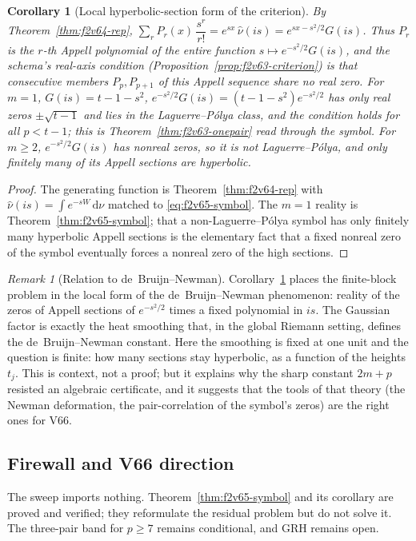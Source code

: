 \documentclass[11pt]{article}
\newtheorem{corollary}[theorem]{Corollary}
\theoremstyle{definition}
\theoremstyle{remark}
\newtheorem{remark}[theorem]{Remark}
\newcommand{\dd}{\,\mathrm d}
\begin{document}
\begin{corollary}[Local hyperbolic-section form of the criterion]
\label{cor:f2v65-section}
By Theorem~\ref{thm:f2v64-rep}, \(\sum_r P_r(x)\,\dfrac{s^r}{r!}
=e^{sx}\,\widehat\nu(is)=e^{sx-s^2/2}G(is)\).  Thus \(P_r\) is the
\(r\)-th Appell polynomial of the entire function
\(s\mapsto e^{-s^2/2}G(is)\), and the schema's real-axis condition
(Proposition~\ref{prop:f2v63-criterion}) is that consecutive members
\(P_p,P_{p+1}\) of this Appell sequence share no real zero.  For \(m=1\),
\(G(is)=t-1-s^2\), \(e^{-s^2/2}G(is)=(t-1-s^2)e^{-s^2/2}\) has only real
zeros \(\pm\sqrt{t-1}\) and lies in the Laguerre--Pólya class, and the
condition holds for all \(p<t-1\); this is Theorem~\ref{thm:f2v63-onepair}
read through the symbol.  For \(m\ge2\), \(e^{-s^2/2}G(is)\) has nonreal
zeros, so it is not Laguerre--Pólya, and only finitely many of its Appell
sections are hyperbolic.
\end{corollary}

\begin{proof}
The generating function is Theorem~\ref{thm:f2v64-rep} with
\(\widehat\nu(is)=\int e^{-sW}\dd\nu\) matched to
\eqref{eq:f2v65-symbol}.  The \(m=1\) reality is
Theorem~\ref{thm:f2v65-symbol}; that a non-Laguerre--Pólya symbol has
only finitely many hyperbolic Appell sections is the elementary fact
that a fixed nonreal zero of the symbol eventually forces a nonreal
zero of the high sections.
\end{proof}

\begin{remark}[Relation to de~Bruijn--Newman]
\label{rem:f2v65-dbn}
Corollary~\ref{cor:f2v65-section} places the finite-block problem in the
local form of the de~Bruijn--Newman phenomenon: reality of the zeros of
Appell sections of \(e^{-s^2/2}\) times a fixed polynomial in \(is\).
The Gaussian factor is exactly the heat smoothing that, in the global
Riemann setting, defines the de~Bruijn--Newman constant.  Here the
smoothing is fixed at one unit and the question is finite: how many
sections stay hyperbolic, as a function of the heights \(t_j\).  This is
context, not a proof; but it explains why the sharp constant \(2m+p\)
resisted an algebraic certificate, and it suggests that the tools of
that theory (the Newman deformation, the pair-correlation of the
symbol's zeros) are the right ones for V66.
\end{remark}

\subsection*{Firewall and V66 direction}
\label{fire:f2v65}
The sweep imports nothing.  Theorem~\ref{thm:f2v65-symbol} and its
corollary are proved and verified; they reformulate the residual
problem but do not solve it.  The three-pair band for \(p\ge7\) remains
conditional, and GRH remains open.
\end{document}
